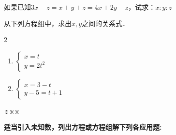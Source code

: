 \begin{enumerate}
\staritem 如果已知$3x-z=x+y+z=4x+2y-z$，试求：$x:y:z$

\staritem 从下列方程组中，求出$x,y$之间的关系式．
\begin{multicols}{2}
\begin{enumerate}
    \item $\begin{cases}
        x=t\\ y=2t^2
    \end{cases}$
    \item $\begin{cases}
        x=3-t\\ y-5=t+1
    \end{cases}$
\end{enumerate}
\end{multicols}

\end{enumerate}

\begin{center}
※\qquad\qquad ※\qquad\qquad ※
\end{center}

\textbf{适当引入未知数，列出方程或方程组解下列各应用题:
}


